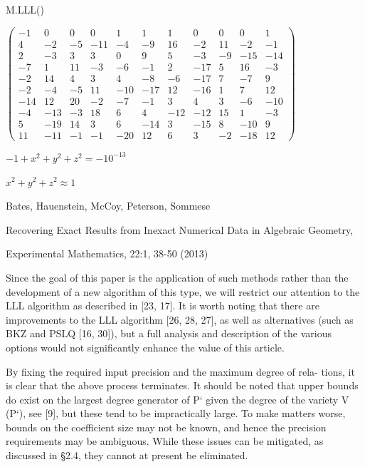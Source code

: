 \documentclass{beamer}
\begin{document}
\begin{frame}
\begin{semiverbatim}
\small

M.LLL()


$\left(\begin{array}{rrrrrrrrrrr}
-1 & 0 & 0 & 0 & 1 & 1 & 1 & 0 & 0 & 0 & 1 \\
4 & -2 & -5 & -11 & -4 & -9 & 16 & -2 & 11 & -2 & -1 \\
2 & -3 & 3 & 3 & 0 & 9 & 5 & -3 & -9 & -15 & -14 \\
-7 & 1 & 11 & -3 & -6 & -1 & 2 & -17 & 5 & 16 & -3 \\
-2 & 14 & 4 & 3 & 4 & -8 & -6 & -17 & 7 & -7 & 9 \\
-2 & -4 & -5 & 11 & -10 & -17 & 12 & -16 & 1 & 7 & 12 \\
-14 & 12 & 20 & -2 & -7 & -1 & 3 & 4 & 3 & -6 & -10 \\
-4 & -13 & -3 & 18 & 6 & 4 & -12 & -12 & 15 & 1 & -3 \\
5 & -19 & 14 & 3 & 6 & -14 & 3 & -15 & 8 & -10 & 9 \\
11 & -11 & -1 & -1 & -20 & 12 & 6 & 3 & -2 & -18 & 12
\end{array}\right)$




\centerline{$-1 + x^2 + y^2 + z^2 = -10^{-13}$}

\centerline{$x^2 + y^2 + z^2 \approx 1$}


\end{semiverbatim}
\end{frame}

\begin{frame}
\begin{exampleblock}{Bates, Hauenstein, McCoy, Peterson, Sommese

Recovering Exact Results from Inexact Numerical Data in Algebraic Geometry,

Experimental Mathematics, 22:1, 38-50 (2013)}

Since the goal of this paper is the application of such methods rather than the
development of a new algorithm of this type, we will restrict our attention
to the LLL algorithm as described in [23, 17]. It is worth noting that there
are improvements to the LLL algorithm [26, 28, 27], as well as alternatives
(such as BKZ and PSLQ [16, 30]), but a full analysis and description of the
various options would not significantly enhance the value of this article.

By fixing the required input precision and the maximum degree of rela-
tions, it is clear that the above process terminates. It should be noted that
upper bounds do exist on the largest degree generator of P` given the degree
of the variety V (P`), see [9], but these tend to be impractically large. To
make matters worse, bounds on the coefficient size may not be known, and
hence the precision requirements may be ambiguous. While these issues can
be mitigated, as discussed in §2.4, they cannot at present be eliminated.

\end{exampleblock}

\end{frame}
\end{document}
